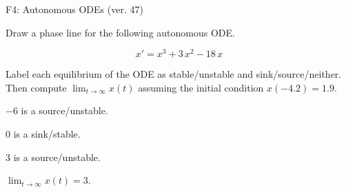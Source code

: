 \begin{exercise}
  \begin{exerciseTitle}F4: Autonomous ODEs (ver. 47)\end{exerciseTitle}
  \begin{exerciseStatement}
    

      Draw a phase line for the following 
      autonomous ODE.
    

    
\[x'= x^{3} + 3 \, x^{2} - 18 \, x\]

    

      Label each equilibrium of the ODE
      as stable/unstable and sink/source/neither.
      Then compute \(\lim_{t\to\infty}x(t)\)
      assuming the initial condition
      \(x( -4.2 )= 1.9\).
    

  \end{exerciseStatement}
  \begin{exerciseAnswer}
    

      \(-6\) is a source/unstable.
      
        \(0\) is a sink/stable.
      
      \(3\) is a source/unstable.
    

    

      \(\lim_{t\to\infty}x(t)=3\).
    

  \end{exerciseAnswer}
\end{exercise}
